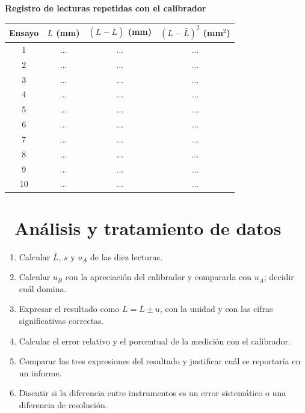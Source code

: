 \documentclass[11pt,a4paper]{article}
\newcommand{\iconotexto}[2]{\textcolor{cyanNeon}{\faIcon{#1}}~#2}
\begin{document}
\begin{center}
\begin{minipage}{\linewidth}
\centering
{\small
\textbf{Registro de lecturas repetidas con el calibrador}\par\smallskip
\begin{tabular}{@{}cccc@{}}
\toprule
Ensayo & $L$ (mm) & $(L-\bar{L})$ (mm) & $(L-\bar{L})^2$ (mm$^2$) \\
\midrule
1 & $\ldots$ & $\ldots$ & $\ldots$ \\
2 & $\ldots$ & $\ldots$ & $\ldots$ \\
3 & $\ldots$ & $\ldots$ & $\ldots$ \\
4 & $\ldots$ & $\ldots$ & $\ldots$ \\
5 & $\ldots$ & $\ldots$ & $\ldots$ \\
6 & $\ldots$ & $\ldots$ & $\ldots$ \\
7 & $\ldots$ & $\ldots$ & $\ldots$ \\
8 & $\ldots$ & $\ldots$ & $\ldots$ \\
9 & $\ldots$ & $\ldots$ & $\ldots$ \\
10 & $\ldots$ & $\ldots$ & $\ldots$ \\
\bottomrule
\end{tabular}
}\par{}
\end{minipage}
\end{center}

\section{\iconotexto{calculator}{Análisis y tratamiento de datos}}

\begin{enumerate}[leftmargin=1.4em,itemsep=2pt,topsep=3pt]
  \item Calcular $\bar{L}$, $s$ y $u_A$ de las diez lecturas.
  \item Calcular $u_B$ con la apreciación del calibrador y compararla con $u_A$; decidir cuál domina.
  \item Expresar el resultado como $L = \bar{L} \pm u$, con la unidad y con las cifras significativas correctas.
  \item Calcular el error relativo y el porcentual de la medición con el calibrador.
  \item Comparar las tres expresiones del resultado y justificar cuál se reportaría en un informe.
  \item Discutir si la diferencia entre instrumentos es un error sistemático o una diferencia de resolución.
\end{enumerate}
\end{document}
